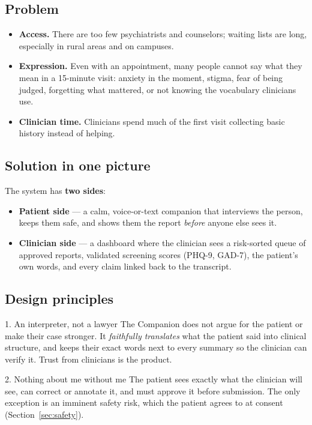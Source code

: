 \documentclass[11pt]{article}
\begin{document}
\subsection{Problem}
\begin{itemize}
  \item \textbf{Access.} There are too few psychiatrists and counselors; waiting lists are long, especially in rural areas and on campuses.
  \item \textbf{Expression.} Even with an appointment, many people cannot say what they mean in a 15-minute visit: anxiety in the moment,
        stigma, fear of being judged, forgetting what mattered, or not knowing the vocabulary clinicians use.
  \item \textbf{Clinician time.} Clinicians spend much of the first visit collecting basic history instead of helping.
\end{itemize}

\subsection{Solution in one picture}
The system has \textbf{two sides}:
\begin{itemize}
  \item \textcolor{patient}{\textbf{Patient side}} --- a calm, voice-or-text companion that interviews the person, keeps them safe,
        and shows them the report \emph{before} anyone else sees it.
  \item \textcolor{clinic}{\textbf{Clinician side}} --- a dashboard where the clinician sees a risk-sorted queue of approved reports,
        validated screening scores (PHQ-9, GAD-7), the patient's own words, and every claim linked back to the transcript.
\end{itemize}

\subsection{Design principles}
\begin{principle}{1. An interpreter, not a lawyer}
The Companion does not argue for the patient or make their case stronger. It \emph{faithfully translates} what the patient
said into clinical structure, and keeps their exact words next to every summary so the clinician can verify it.
Trust from clinicians is the product.
\end{principle}

\begin{principle}{2. Nothing about me without me}
The patient sees exactly what the clinician will see, can correct or annotate it, and must approve it before submission.
The only exception is an imminent safety risk, which the patient agrees to at consent (Section~\ref{sec:safety}).
\end{principle}
\end{document}
